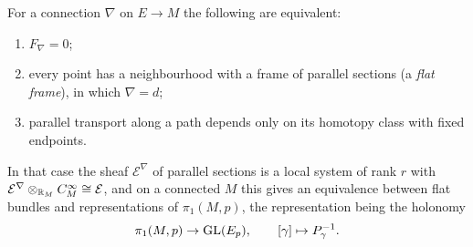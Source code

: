 \begin{theorem}\label{connections:theorem-flat-local-systems}
For a connection $\nabla$ on $E \to M$ the following are equivalent:
\begin{enumerate}
\item $F_\nabla = 0$;
\item every point has a neighbourhood with a frame of parallel sections (a \emph{flat frame}), in which $\nabla = d$;
\item parallel transport along a path depends only on its homotopy class with fixed endpoints.
\end{enumerate}
In that case the sheaf $\mathcal{E}^\nabla$ of parallel sections is a local system of rank $r$ with $\mathcal{E}^\nabla \otimes_{\mathbb{R}_M} C^\infty_M \cong \mathcal{E}$, and on a connected $M$ this gives an
equivalence between flat bundles and representations of $\pi_1(M, p)$, the representation being the holonomy
\[
\pi_1(M, p) \to \mathrm{GL}(E_p), \qquad [\gamma] \mapsto P_\gamma^{-1}.
\]
\end{theorem}

